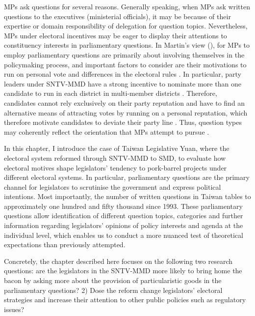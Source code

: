 MPs ask questions for several reasons. Generally speaking, when MPs ask written questions to the executives (ministerial officials), it may be because of their expertise or domain responsibility of delegation for question topics. Nevertheless, MPs under electoral incentives may be eager to display their attentions to constituency interests in parliamentary questions. In Martin's view (\cite{Martin2011}), for MPs to employ parliamentary questions are primarily about involving themselves in the policymaking process, and important factors to consider are their motivations to run on personal vote and differences in the electoral rules \citep[][p.260]{Martin2011}. In particular, party leaders under SNTV-MMD have a strong incentive to nominate more than one candidate to run in each district in multi-member districts \citep{Cain1987, Carey1995,Reed1995, Catalinac2017}. Therefore, candidates cannot rely exclusively on their party reputation and have to find an alternative means of attracting votes by running on a personal reputation, which therefore motivate candidates to deviate their party line \citep{Cain1987, Carey1995}. Thus, question types may coherently reflect the orientation that MPs attempt to pursue \citep{Saalfeld2011, Martin2011, Martin2017}.  

In this chapter, I introduce the case of Taiwan Legislative Yuan, where the electoral system reformed through SNTV-MMD to SMD, to evaluate how electoral motives shape legislators' tendency to pork-barrel projects under different electoral systems. In particular, parliamentary questions are the primary channel for legislators to scrutinise the government and express political intentions. Most importantly, the number of written questions in Taiwan tables to approximately one hundred and fifty thousand since 1993. These parliamentary questions allow identification of different question topics, categories and further information regarding legislators' opinions of policy interests and agenda at the individual level, which enables us to conduct a more nuanced test of theoretical expectations than previously attempted. 

Concretely, the chapter described here focuses on the following two research questions: are the legislators in the SNTV-MMD more likely to bring home the bacon by asking more about the provision of particularistic goods in the parliamentary questions? 2) Dose the reform change legislators' electoral strategies and increase their attention to other public policies such as regulatory issues? 

